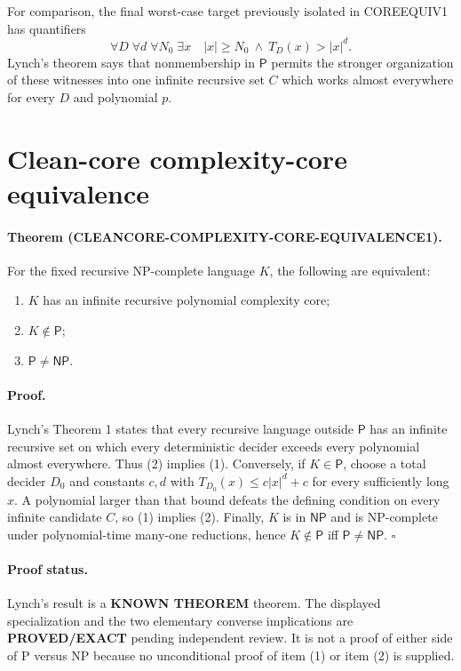 \documentclass[11pt]{article}
\newcommand{\Pclass}{\mathsf P}
\newcommand{\NPclass}{\mathsf{NP}}
\newcommand{\EXACT}{\textbf{PROVED/EXACT}}
\newcommand{\KNOWN}{\textbf{KNOWN THEOREM}}
\begin{document}
For comparison, the final worst-case target previously isolated in COREEQUIV1
has quantifiers
\[
 \forall D\;\forall d\;\forall N_0\;\exists x
 \quad |x|\ge N_0\ \wedge\ T_D(x)>|x|^d.
\]
Lynch's theorem says that nonmembership in \(\Pclass\) permits the stronger
organization of these witnesses into one infinite recursive set \(C\) which
works almost everywhere for every \(D\) and polynomial \(p\).

\section{Clean-core complexity-core equivalence}
\paragraph{Theorem (CLEANCORE-COMPLEXITY-CORE-EQUIVALENCE1).}
For the fixed recursive NP-complete language \(K\), the following are
equivalent:
\begin{enumerate}[leftmargin=*]
\item \(K\) has an infinite recursive polynomial complexity core;
\item \(K\notin\Pclass\);
\item \(\Pclass\ne\NPclass\).
\end{enumerate}

\paragraph{Proof.}
Lynch's Theorem 1 states that every recursive language outside \(\Pclass\)
has an infinite recursive set on which every deterministic decider exceeds
every polynomial almost everywhere.  Thus (2) implies (1).  Conversely, if
\(K\in\Pclass\), choose a total decider \(D_0\) and constants \(c,d\) with
\(T_{D_0}(x)\le c|x|^d+c\) for every sufficiently long \(x\).  A polynomial
larger than that bound defeats the defining condition on every infinite
candidate \(C\), so (1) implies (2).  Finally, \(K\) is in \(\NPclass\) and is
NP-complete under polynomial-time many-one reductions, hence
\(K\notin\Pclass\) iff \(\Pclass\ne\NPclass\). \hfill\(\square\)

\paragraph{Proof status.}
Lynch's result is a \KNOWN{} theorem.  The displayed specialization and the
two elementary converse implications are \EXACT{} pending independent review.
It is not a proof of either side of P versus NP because no unconditional proof
of item (1) or item (2) is supplied.
\end{document}
